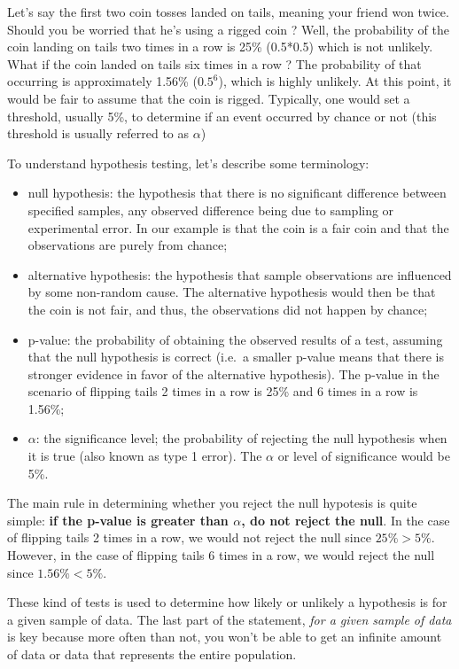 \documentclass[11pt]{article}
\providecommand{\tightlist}{%
      \setlength{\itemsep}{0pt}\setlength{\parskip}{0pt}}
\begin{document}
Let's say the first two coin tosses landed on tails, meaning your friend
won twice. Should you be worried that he's using a rigged coin ? Well,
the probability of the coin landing on tails two times in a row is 25\%
(0.5*0.5) which is not unlikely. What if the coin landed on tails six
times in a row ? The probability of that occurring is approximately
1.56\% (\(0.5^6\)), which is highly unlikely. At this point, it would be
fair to assume that the coin is rigged. Typically, one would set a
threshold, usually 5\%, to determine if an event occurred by chance or
not (this threshold is usually referred to as \(\alpha\))

To understand hypothesis testing, let's describe some terminology:

\begin{itemize}
\tightlist
\item
  null hypothesis: the hypothesis that there is no significant
  difference between specified samples, any observed difference being
  due to sampling or experimental error. In our example is that the coin
  is a fair coin and that the observations are purely from chance;
\item
  alternative hypothesis: the hypothesis that sample observations are
  influenced by some non-random cause. The alternative hypothesis would
  then be that the coin is not fair, and thus, the observations did not
  happen by chance;
\item
  p-value: the probability of obtaining the observed results of a test,
  assuming that the null hypothesis is correct (i.e.~a smaller p-value
  means that there is stronger evidence in favor of the alternative
  hypothesis). The p-value in the scenario of flipping tails 2 times in
  a row is 25\% and 6 times in a row is 1.56\%;
\item
  \(\alpha\): the significance level; the probability of rejecting the
  null hypothesis when it is true (also known as type 1 error). The
  \(\alpha\) or level of significance would be 5\%.
\end{itemize}

The main rule in determining whether you reject the null hypotesis is
quite simple: \textbf{if the p-value is greater than \(\alpha\), do not
reject the null}. In the case of flipping tails 2 times in a row, we
would not reject the null since \(25\% > 5\%\). However, in the case of
flipping tails 6 times in a row, we would reject the null since
\(1.56\% < 5\%\).

These kind of tests is used to determine how likely or unlikely a
hypothesis is for a given sample of data. The last part of the
statement, \emph{for a given sample of data} is key because more often
than not, you won't be able to get an infinite amount of data or data
that represents the entire population.
\end{document}
